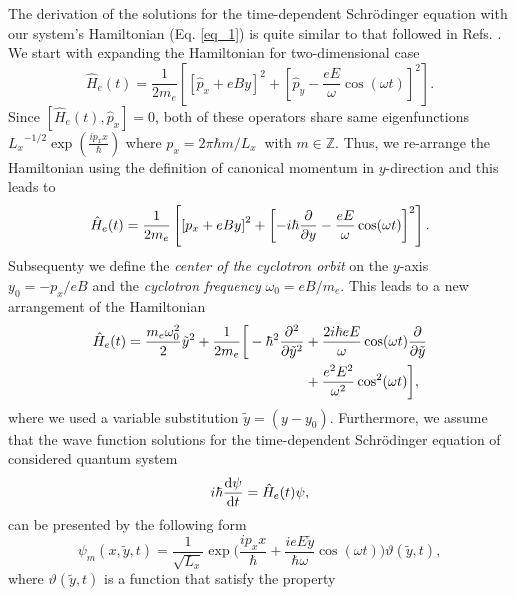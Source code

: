 The derivation of the solutions for the time-dependent Schrödinger equation with our system's Hamiltonian (Eq. \ref{eq_1}) is quite similar to that followed in Refs. \cite{husimi53,dini16}. We start with expanding the Hamiltonian for two-dimensional case
\begin{equation} \label{eq_a1}
  \hat{H}_e(t) = \frac{1}{2m_e}\left[
    \left[\hat{p}_x + eBy \right]^2 +
    \left[\hat{p}_y - \frac{eE}{\omega}\cos(\omega t)\right]^2
  \right].
\end{equation}
Since $\left[\hat{H}_e(t),\hat{p}_x \right] =0$, both of these operators share same eigenfunctions
${L_x}^{-1/2}\exp(\frac{ip_x x}{\hbar})$ where $p_x = 2\pi \hbar m/L_x~$ with $ m \in \mathbb{Z}$.
Thus, we re-arrange the Hamiltonian using the definition of canonical momentum in $y$-direction and this leads to
\begin{equation} \label{eq_a2}
    \hat{H}_e(t) = \frac{1}{2m_e}\left[
      \left[{p}_x + eBy \right]^2 +
      \left[-i\hbar \pdv{y}- \frac{eE}{\omega}\cos(\omega t)\right]^2
    \right].
\end{equation}
Subsequenty we define the \textit{center of the cyclotron orbit} on the $y$-axis $y_0 = {-p_x}/{eB}$ and the \textit{cyclotron frequency} $\omega_0 = {eB}/{m_e}$. This leads to a new arrangement of the Hamiltonian
\begin{equation} \label{eq_a3}
  \begin{aligned}
    \hat{H}_e(t) =
      \frac{m_e \omega_0^2}{2}\tilde{y}^2 +
      \frac{1}{2m_e}\bigg[
      -\hbar^2 \pdv[2]{\tilde{y}} & +
      \frac{2i\hbar eE}{\omega}\cos(\omega t) \pdv{\tilde{y}} \\
      & +
      \frac{e^2E^2}{\omega^2}\cos[2](\omega t)
      \bigg],
  \end{aligned}
\end{equation}
where we used a variable substitution $\tilde{y} = (y - y_0)$. Furthermore, we assume that the wave function solutions for the time-dependent Schrödinger equation of considered quantum system
\begin{equation} \label{eq_a4}
    i \hbar \dv{\psi}{t} = \hat{H}_e(t)\psi,
\end{equation}
can be presented by the following form
\begin{equation} \label{eq_a5}
    \psi_m(x,\tilde{y},t) = \frac{1}{\sqrt{L_x}} \exp\bigg(
      \frac{ip_x x}{\hbar} +
      \frac{ieE\tilde{y}}{\hbar \omega}\cos(\omega t)
    \bigg) \vartheta(\tilde{y},t),
\end{equation}
where $\vartheta(\tilde{y},t)$ is a function that satisfy the property
